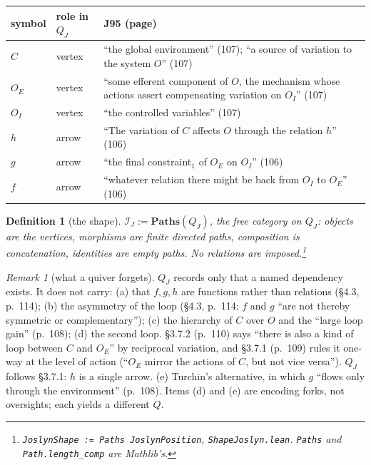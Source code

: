 \documentclass[10pt]{article}
\newtheorem{definition}{Definition}
\theoremstyle{remark}
\newtheorem{remark}{Remark}
\newcommand{\J}{\textsf{J95}}
\newcommand{\cat}[1]{\mathcal{#1}}
\newcommand{\Paths}{\mathbf{Paths}}
\newcommand{\lean}[1]{\texttt{#1}}
\begin{document}
\begin{table}[h]\vspace{-8pt}\centering\footnotesize
\begin{tabular}{@{}llp{}@{}}
\toprule
symbol & role in $Q_J$ & \J{} (page) \\
\midrule
$C$ & vertex & ``the global environment'' (107); ``a source of variation to the system $O$'' (107) \\
$O_E$ & vertex & ``some efferent component of $O$, the mechanism whose actions assert compensating variation on $O_I$'' (107) \\
$O_I$ & vertex & ``the controlled variables'' (107) \\
$h$ & arrow & ``The variation of $C$ affects $O$ through the relation $h$'' (106) \\
$g$ & arrow & ``the final constraint$_1$ of $O_E$ on $O_I$'' (106) \\
$f$ & arrow & ``whatever relation there might be back from $O_I$ to $O_E$'' (106) \\
\bottomrule
\end{tabular}\vspace{-10pt}
\end{table}

\begin{definition}[the shape]\label{def:shape}
$\cat{I}_J := \Paths(Q_J)$, the free category on $Q_J$: objects are the vertices, morphisms are finite directed paths, composition is concatenation, identities are empty paths. No relations are imposed.\footnote{\lean{JoslynShape := Paths JoslynPosition}, \lean{ShapeJoslyn.lean}. \lean{Paths} and \lean{Path.length\_comp} are Mathlib's.}
\end{definition}

\begin{remark}[what a quiver forgets]\label{rem:forgets}
$Q_J$ records only that a named dependency exists. It does not carry:
(a) that $f,g,h$ are functions rather than relations (\S4.3, p.~114);
(b) the asymmetry of the loop (\S4.3, p.~114: $f$ and $g$ ``are not thereby symmetric or complementary'');
(c) the hierarchy of $C$ over $O$ and the ``large loop gain'' (p.~108);
(d) the second loop. \S3.7.2 (p.~110) says ``there is also a kind of loop between $C$ and $O_E$'' by reciprocal variation, and \S3.7.1 (p.~109) rules it one-way at the level of action (``$O_E$ mirror the actions of $C$, but not vice versa''). $Q_J$ follows \S3.7.1: $h$ is a single arrow.
(e) Turchin's alternative, in which $g$ ``flows only through the environment'' (p.~108). Items (d) and (e) are encoding forks, not oversights; each yields a different $Q$.
\end{remark}
\end{document}
